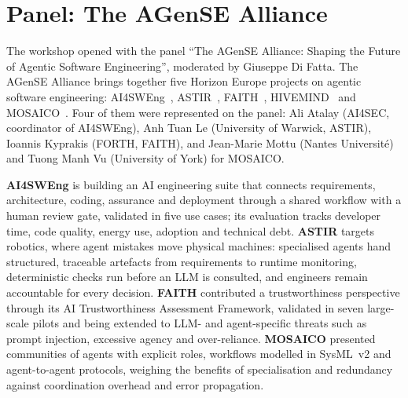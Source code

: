 \section{Panel: The AGenSE Alliance}
\label{sec:panel}

The workshop opened with the panel ``The AGenSE Alliance: Shaping the Future of Agentic Software Engineering'', moderated by Giuseppe Di Fatta. The AGenSE Alliance brings together five Horizon Europe projects on agentic software engineering: AI4SWEng~\cite{proj:ai4sweng}, ASTIR~\cite{proj:astir}, FAITH~\cite{proj:faith}, HIVEMIND~\cite{proj:hivemind} and MOSAICO~\cite{proj:mosaico}. Four of them were represented on the panel: Ali Atalay (AI4SEC, coordinator of AI4SWEng), Anh Tuan Le (University of Warwick, ASTIR), Ioannis Kyprakis (FORTH, FAITH), and Jean-Marie Mottu (Nantes Université) and Tuong Manh Vu (University of York) for MOSAICO.

\textbf{AI4SWEng} is building an AI engineering suite that connects requirements, architecture, coding, assurance and deployment through a shared workflow with a human review gate, validated in five use cases; its evaluation tracks developer time, code quality, energy use, adoption and technical debt. \textbf{ASTIR} targets robotics, where agent mistakes move physical machines: specialised agents hand structured, traceable artefacts from requirements to runtime monitoring, deterministic checks run before an LLM is consulted, and engineers remain accountable for every decision. \textbf{FAITH} contributed a trustworthiness perspective through its AI Trustworthiness Assessment Framework, validated in seven large-scale pilots and being extended to LLM- and agent-specific threats such as prompt injection, excessive agency and over-reliance. \textbf{MOSAICO} presented communities of agents with explicit roles, workflows modelled in SysML~v2 and agent-to-agent protocols, weighing the benefits of specialisation and redundancy against coordination overhead and error propagation.

